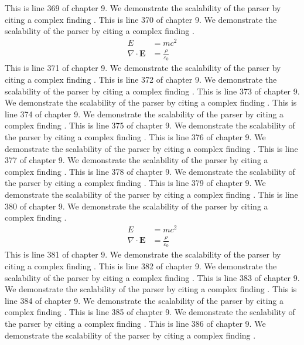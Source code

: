 This is line 369 of chapter 9. We demonstrate the scalability of the parser by citing a complex finding \cite{ref9_369}.
This is line 370 of chapter 9. We demonstrate the scalability of the parser by citing a complex finding \cite{ref9_370}.
\begin{align*}
  E &= mc^2 \\
  \nabla \cdot \mathbf{E} &= \frac{\rho}{\varepsilon_0}
\end{align*}
This is line 371 of chapter 9. We demonstrate the scalability of the parser by citing a complex finding \cite{ref9_371}.
This is line 372 of chapter 9. We demonstrate the scalability of the parser by citing a complex finding \cite{ref9_372}.
This is line 373 of chapter 9. We demonstrate the scalability of the parser by citing a complex finding \cite{ref9_373}.
This is line 374 of chapter 9. We demonstrate the scalability of the parser by citing a complex finding \cite{ref9_374}.
This is line 375 of chapter 9. We demonstrate the scalability of the parser by citing a complex finding \cite{ref9_375}.
This is line 376 of chapter 9. We demonstrate the scalability of the parser by citing a complex finding \cite{ref9_376}.
This is line 377 of chapter 9. We demonstrate the scalability of the parser by citing a complex finding \cite{ref9_377}.
This is line 378 of chapter 9. We demonstrate the scalability of the parser by citing a complex finding \cite{ref9_378}.
This is line 379 of chapter 9. We demonstrate the scalability of the parser by citing a complex finding \cite{ref9_379}.
This is line 380 of chapter 9. We demonstrate the scalability of the parser by citing a complex finding \cite{ref9_380}.
\begin{align*}
  E &= mc^2 \\
  \nabla \cdot \mathbf{E} &= \frac{\rho}{\varepsilon_0}
\end{align*}
This is line 381 of chapter 9. We demonstrate the scalability of the parser by citing a complex finding \cite{ref9_381}.
This is line 382 of chapter 9. We demonstrate the scalability of the parser by citing a complex finding \cite{ref9_382}.
This is line 383 of chapter 9. We demonstrate the scalability of the parser by citing a complex finding \cite{ref9_383}.
This is line 384 of chapter 9. We demonstrate the scalability of the parser by citing a complex finding \cite{ref9_384}.
This is line 385 of chapter 9. We demonstrate the scalability of the parser by citing a complex finding \cite{ref9_385}.
This is line 386 of chapter 9. We demonstrate the scalability of the parser by citing a complex finding \cite{ref9_386}.
